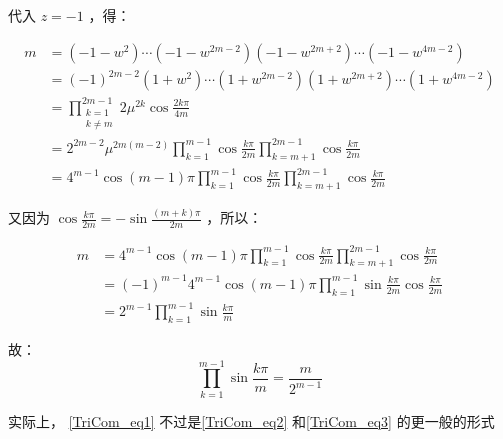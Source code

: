 代入 $z=-1$ ，得：

$$\begin{aligned} m&=(-1-w^2)\cdots(-1-w^{2m-2})(-1-w^{2m+2})\cdots(-1-w^{4m-2})\\ &=(-1)^{2m-2}(1+w^2)\cdots(1+w^{2m-2})(1+w^{2m+2})\cdots(1+w^{4m-2})\\ &=\prod_{\substack{k=1\\k\neq m}}^{2m-1}2\mu^{2k}\cos\frac{2k\pi}{4m}\\ &=2^{2m-2}\mu^{2m(m-2)}\prod_{k=1}^{m-1}\cos\frac{k\pi}{2m}\prod_{k=m+1}^{2m-1}\cos\frac{k\pi}{2m}\\ &=4^{m-1}\cos(m-1)\pi\prod_{k=1}^{m-1}\cos\frac{k\pi}{2m}\prod_{k=m+1}^{2m-1}\cos\frac{k\pi}{2m}  \end{aligned}$$

又因为 $\displaystyle{\cos\frac{k\pi}{2m}=-\sin\frac{(m+k)\pi}{2m}}$ ，所以：

$$\begin{aligned} m&=4^{m-1}\cos(m-1)\pi\prod_{k=1}^{m-1}\cos\frac{k\pi}{2m}\prod_{k=m+1}^{2m-1}\cos\frac{k\pi}{2m}\\ &=(-1)^{m-1}4^{m-1}\cos(m-1)\pi\prod_{k=1}^{m-1}\sin\frac{k\pi}{2m}\cos\frac{k\pi}{2m}\\ &=2^{m-1}\prod_{k=1}^{m-1}\sin\frac{k\pi}{m} \end{aligned}$$

故：
\begin{equation}\label{TriCom_eq1}%
\prod_{k=1}^{m-1}\sin\frac{k\pi}{m}=\frac{m}{2^{m-1}}
\end{equation}

实际上， \autoref{TriCom_eq1}  不过是\autoref{TriCom_eq2}  和\autoref{TriCom_eq3} 的更一般的形式
